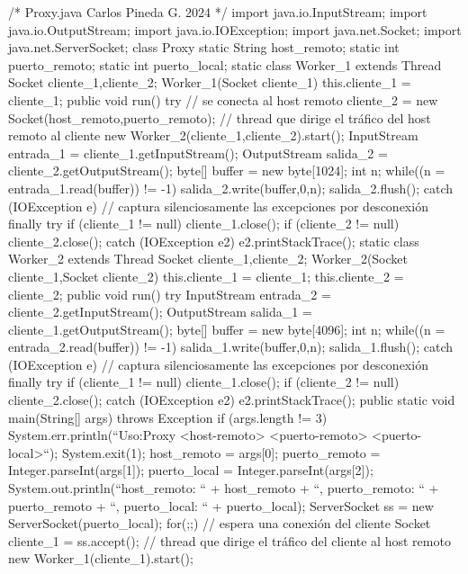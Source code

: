 \documentclass[11pt,a4paper,oneside]{book}
\begin{document}
\begin{SourceCode}
/*
  Proxy.java
  Carlos Pineda G. 2024
*/
import java.io.InputStream;
import java.io.OutputStream;
import java.io.IOException;
import java.net.Socket;
import java.net.ServerSocket;
class Proxy
{
  static String host_remoto;
  static int puerto_remoto;
  static int puerto_local;
  static class Worker_1 extends Thread
  {
    Socket cliente_1,cliente_2;
    Worker_1(Socket cliente_1)
    {
      this.cliente_1 = cliente_1;
    }
    public void run()
    {
      try
      {
        // se conecta al host remoto
        cliente_2 = new Socket(host_remoto,puerto_remoto);
        // thread que dirige el tráfico del host remoto al cliente
        new Worker_2(cliente_1,cliente_2).start();
        InputStream entrada_1 = cliente_1.getInputStream();
        OutputStream salida_2 = cliente_2.getOutputStream();
        byte[] buffer = new byte[1024];
        int n;
        while((n = entrada_1.read(buffer)) != -1)
        {
          salida_2.write(buffer,0,n);
          salida_2.flush();
        }
      }
      catch (IOException e)
      {
        // captura silenciosamente las excepciones por desconexión
      }
      finally
      {
        try
        {
          if (cliente_1 != null) cliente_1.close();
          if (cliente_2 != null) cliente_2.close();
        }
        catch (IOException e2)
        {
          e2.printStackTrace();
        }
      }
    }
  }
  static class Worker_2 extends Thread
  {
    Socket cliente_1,cliente_2;
    Worker_2(Socket cliente_1,Socket cliente_2)
    {
      this.cliente_1 = cliente_1;
      this.cliente_2 = cliente_2;
    }
    public void run()
    {
      try
      {
        InputStream entrada_2 = cliente_2.getInputStream();
        OutputStream salida_1 = cliente_1.getOutputStream();
        byte[] buffer = new byte[4096];
        int n;
        while((n = entrada_2.read(buffer)) != -1)
        {
          salida_1.write(buffer,0,n);
          salida_1.flush();
        } 
      }
      catch (IOException e)
      {
        // captura silenciosamente las excepciones por desconexión
      }
      finally
      {
        try
        {
          if (cliente_1 != null) cliente_1.close();
          if (cliente_2 != null) cliente_2.close();
        }
        catch (IOException e2)
        {
          e2.printStackTrace();
        }
      }
    }
  }
  public static void main(String[] args) throws Exception
  {
    if (args.length != 3)
    { 
      System.err.println(``Uso:\njava Proxy <host-remoto> <puerto-remoto> <puerto-local>``);
      System.exit(1);
    }
    host_remoto = args[0];
    puerto_remoto = Integer.parseInt(args[1]);
    puerto_local = Integer.parseInt(args[2]);
    System.out.println(``host_remoto: `` + host_remoto + ``, puerto_remoto: `` + puerto_remoto + ``, puerto_local: `` + puerto_local);
    ServerSocket ss = new ServerSocket(puerto_local);
    for(;;)
    {
      // espera una conexión del cliente
      Socket cliente_1 = ss.accept();
      // thread que dirige el tráfico del cliente al host remoto
      new Worker_1(cliente_1).start();
    }
  }
}
\end{SourceCode}
\end{document}
